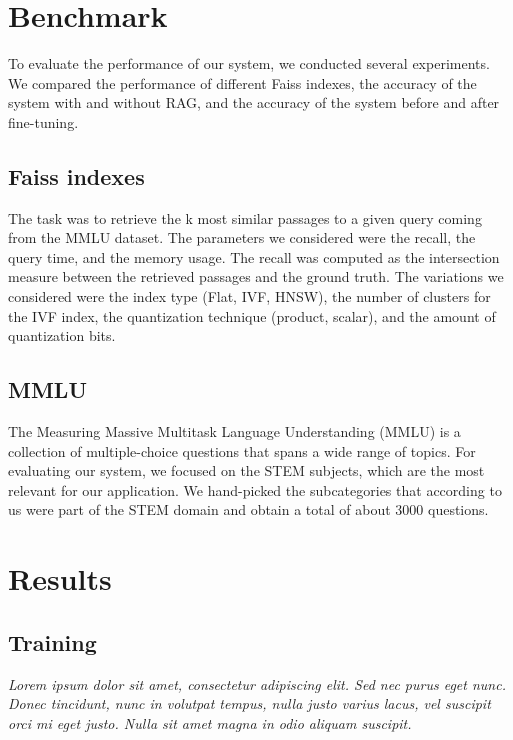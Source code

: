 \documentclass[11pt]{article}
\begin{document}
\section{Benchmark}

To evaluate the performance of our system, we conducted several experiments.
We compared the performance of different Faiss indexes, the accuracy of the system with and without RAG,
and the accuracy of the system before and after fine-tuning.

\subsection{Faiss indexes}

The task was to retrieve the k most similar passages to a
given query coming from the MMLU dataset.
The parameters we considered were the recall, the query time, 
and the memory usage. 
The recall was computed as the intersection measure between the retrieved 
passages and the ground truth. 
The variations we considered were the index type (Flat, IVF, HNSW), the number 
of clusters for the IVF index, the quantization technique (product, scalar), and
the amount of quantization bits.

\subsection{MMLU}

The Measuring Massive Multitask Language Understanding (MMLU) is a collection of 
multiple-choice questions that spans a wide range of topics.
For evaluating our system, we focused on the STEM subjects, which are the most
relevant for our application.
We hand-picked the subcategories that according to us were part of the STEM domain and
obtain a total of about 3000 questions.

\section{Results}

\subsection{Training}

\textit{Lorem ipsum dolor sit amet, consectetur adipiscing elit. Sed nec purus eget
nunc. Donec tincidunt, nunc in volutpat tempus, nulla justo varius lacus, vel
suscipit orci mi eget justo. Nulla sit amet magna in odio aliquam suscipit.}
\end{document}
